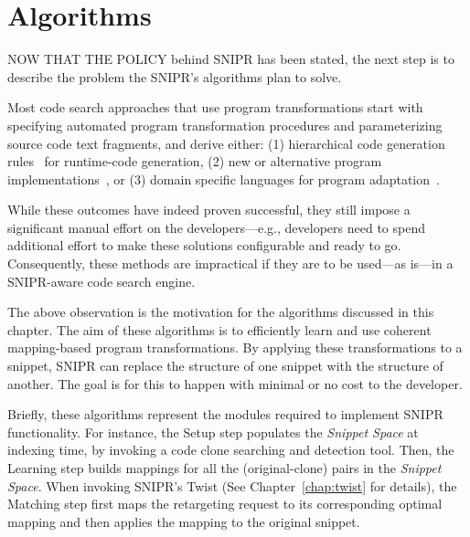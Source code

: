 \chapter{Algorithms}{}
\label{chap:algorithms}

\lettrine[lraise=0.1, nindent=0em, slope=-.5em]{N}{OW THAT THE POLICY} behind \uppercase{SNIPR} has been stated, the next step is to describe the problem the SNIPR's algorithms plan to solve.
% 

Most code search approaches that use program transformations start with specifying automated program transformation procedures and parameterizing source code text fragments, and derive either: (1) hierarchical code generation rules~\cite{Nita:2010en} for runtime-code generation, (2) new or alternative program implementations~\cite{Wightman:2012gc}, or (3) domain specific languages for program adaptation~\cite{Visser:2001tc}.

While these outcomes have indeed proven successful, they still impose a significant manual effort on the developers---e.g., developers need to spend additional effort to make these solutions configurable and ready to go. Consequently, these methods are impractical if they are to be used---as is---in a \uppercase{SNIPR}-aware code search engine. 

The above observation is the motivation for the algorithms discussed in this chapter. The aim of these algorithms is to efficiently learn and use coherent mapping-based program transformations. By applying these transformations to a snippet, \uppercase{SnipR} can replace the structure of one snippet with the structure of another. The goal is for this to happen with minimal or no cost to the developer. 

Briefly, these algorithms represent the modules required to implement \uppercase{SnipR} functionality. For instance, the Setup step populates the \emph{Snippet Space} at indexing time, by invoking a code clone searching and detection tool. Then, the Learning step builds mappings for all the (original-clone) pairs in the \emph{Snippet Space}. When invoking \uppercase{SnipR}'s Twist (See Chapter~\ref{chap:twist} for details), the Matching step first maps the retargeting request to its corresponding optimal mapping and then applies the mapping to the original snippet.

